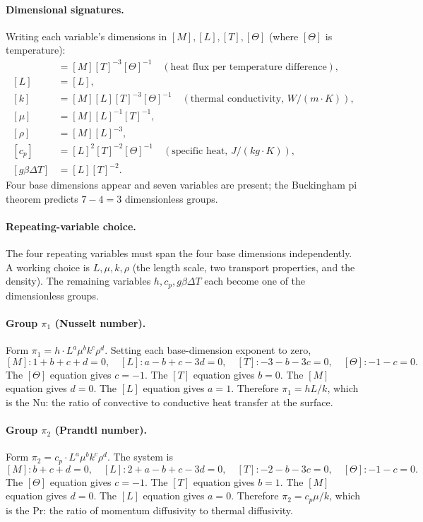 \paragraph{Dimensional signatures.} Writing each variable's dimensions
in $[M], [L], [T], [\Theta]$ (where $[\Theta]$ is temperature):
\begin{align*}
[h] &= [M][T]^{-3}[\Theta]^{-1}
\quad (\text{heat flux per temperature difference}), \\
[L] &= [L], \\
[k] &= [M][L][T]^{-3}[\Theta]^{-1}
\quad (\text{thermal conductivity, } W/(m\cdot K)), \\
[\mu] &= [M][L]^{-1}[T]^{-1}, \\
[\rho] &= [M][L]^{-3}, \\
[c_{p}] &= [L]^{2}[T]^{-2}[\Theta]^{-1}
\quad (\text{specific heat, } J/(kg\cdot K)), \\
[g \beta \Delta T] &= [L][T]^{-2}.
\end{align*}
Four base dimensions appear and seven variables are present; the
Buckingham pi theorem predicts $7 - 4 = 3$ dimensionless groups.

\paragraph{Repeating-variable choice.} The four repeating variables
must span the four base dimensions independently. A working choice is
$L, \mu, k, \rho$ (the length scale, two transport properties, and
the density). The remaining variables $h, c_{p}, g\beta\Delta T$ each
become one of the dimensionless groups.

\paragraph{Group $\pi_{1}$ (Nusselt number).} Form $\pi_{1} = h \cdot
L^{a} \mu^{b} k^{c} \rho^{d}$. Setting each base-dimension exponent
to zero,
\[
[M]: 1 + b + c + d = 0, \quad
[L]: a - b + c - 3d = 0, \quad
[T]: -3 - b - 3c = 0, \quad
[\Theta]: -1 - c = 0.
\]
The $[\Theta]$ equation gives $c = -1$. The $[T]$ equation gives
$b = 0$. The $[M]$ equation gives $d = 0$. The $[L]$ equation gives
$a = 1$. Therefore $\pi_{1} = h L / k$, which is the  $\mathrm{Nu}$: the ratio of convective to conductive heat
transfer at the surface.

\paragraph{Group $\pi_{2}$ (Prandtl number).} Form $\pi_{2} = c_{p}
\cdot L^{a} \mu^{b} k^{c} \rho^{d}$. The system is
\[
[M]: b + c + d = 0, \quad
[L]: 2 + a - b + c - 3d = 0, \quad
[T]: -2 - b - 3c = 0, \quad
[\Theta]: -1 - c = 0.
\]
The $[\Theta]$ equation gives $c = -1$. The $[T]$ equation gives
$b = 1$. The $[M]$ equation gives $d = 0$. The $[L]$ equation gives
$a = 0$. Therefore $\pi_{2} = c_{p} \mu / k$, which is the
 $\mathrm{Pr}$: the ratio of momentum
diffusivity to thermal diffusivity.

